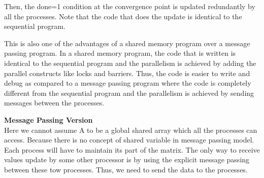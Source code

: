 \documentclass[12pt]{book}
\begin{document}
Then, the done=1 condition at the convergence point is updated redundantly by all the processes.
Note that the code that does the update is identical to the sequential program.

This is also one of the advantages of a shared memory program over a message passing program.
In a shared memory program, the code that is written is identical to the sequential program and the parallelism is achieved by adding the parallel constructs like locks and barriers.
Thus, the code is easier to write and debug as compared to a message passing program where the code is completely different from the sequential program and the parallelism is achieved by sending messages between the processes.

\textbf{Message Passing Version}\\
Here we cannot assume A to be a global shared array which all the processes can access.
Because there is no concept of shared variable in message passing model. Each process will have to maintain its part of the matrix.
The only way to receive values update by some other processor is by using the explicit message passing between these tow processes.
Thus, we need to send the data to the processes.
\end{document}
